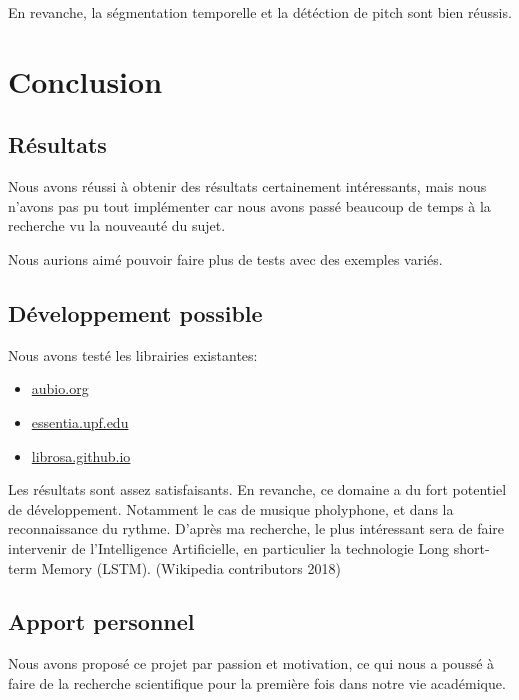 \documentclass[]{article}
\providecommand{\tightlist}{%
  \setlength{\itemsep}{0pt}\setlength{\parskip}{0pt}}
\begin{document}
En revanche, la ségmentation temporelle et la détéction de pitch sont
bien réussis.

\pagebreak

\hypertarget{conclusion}{%
\section{Conclusion}\label{conclusion}}

\hypertarget{resultats-1}{%
\subsection{Résultats}\label{resultats-1}}

Nous avons réussi à obtenir des résultats certainement intéressants,
mais nous n'avons pas pu tout implémenter car nous avons passé beaucoup
de temps à la recherche vu la nouveauté du sujet.

Nous aurions aimé pouvoir faire plus de tests avec des exemples variés.

\hypertarget{developpement-possible}{%
\subsection{Développement possible}\label{developpement-possible}}

Nous avons testé les librairies existantes:

\begin{itemize}
\tightlist
\item
  \url{aubio.org}
\item
  \url{essentia.upf.edu}
\item
  \url{librosa.github.io}
\end{itemize}

Les résultats sont assez satisfaisants. En revanche, ce domaine a du
fort potentiel de développement. Notamment le cas de musique pholyphone,
et dans la reconnaissance du rythme. D'après ma recherche, le plus
intéressant sera de faire intervenir de l'Intelligence Artificielle, en
particulier la technologie Long short-term Memory (LSTM). (Wikipedia
contributors 2018)

\hypertarget{apport-personnel}{%
\subsection{Apport personnel}\label{apport-personnel}}

Nous avons proposé ce projet par passion et motivation, ce qui nous a
poussé à faire de la recherche scientifique pour la première fois dans
notre vie académique.
\end{document}
